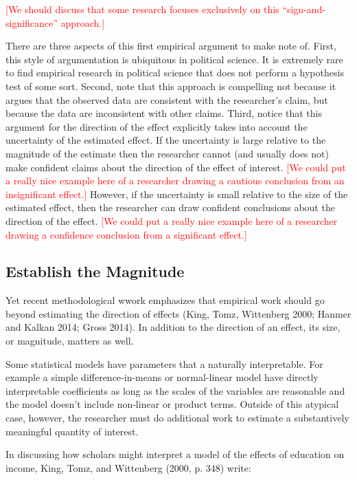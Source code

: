 \documentclass[12pt]{article}
\newcommand{\comment}[1]{\textcolor{red}{#1}}
\begin{document}
\comment{[We should discuss that some research focuses exclusively on this ``sign-and-significance'' approach.]}

There are three aspects of this first empirical argument to make note of. First, this style of argumentation is ubiquitous in political science. It is extremely rare to find empirical research in political science that does not perform a hypothesis test of some sort. Second, note that this approach is compelling not because it argues that the observed data are consistent with the researcher's claim, but because the data are inconsistent with other claims. Third, notice that this argument for the direction of the effect explicitly takes into account the uncertainty of the estimated effect. If the uncertainty is large relative to the magnitude of the estimate then the researcher cannot (and usually does not) make confident claims about the direction of the effect of interest. \comment{[We could put a really nice example here of a researcher drawing a cautious conclusion from an insignificant effect.]} However, if the uncertainty is small relative to the size of the estimated effect, then the researcher can draw confident conclusions about the direction of the effect. \comment{[We could put a really nice example here of a researcher drawing a confidence conclusion from a significant effect.]}

\subsection*{Establish the Magnitude}

Yet recent methodological wwork emphasizes that empirical work should go beyond estimating the direction of effects (King, Tomz, Wittenberg 2000; Hanmer and Kalkan 2014; Gross 2014). In addition to the direction of an effect, its size, or magnitude, matters as well. 

Some statistical models have parameters that a naturally interpretable. For example a simple difference-in-means or normal-linear model have directly interpretable coefficients as long as the scales of the variables are reasonable and the model doesn't include non-linear or product terms. Outside of this atypical case, however, the researcher must do additional work to estimate a substantively meaningful quantity of interest.

In discussing how scholars might interpret a model of the effects of education on income, King, Tomz, and Wittenberg (2000, p. 348) write:
\end{document}
